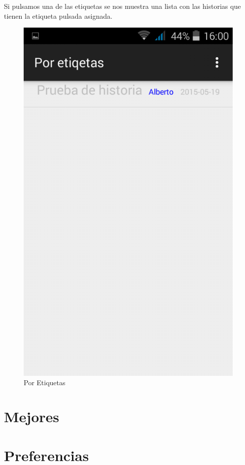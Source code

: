 \documentclass[11pt,a4paper, titlepage]{article}
\begin{document}
	Si pulsamos una de las etiquetas se nos muestra una lista con las historias que tienen la etiqueta pulsada asignada.
	
	\begin{figure}[hbtp]
		\centering
		\includegraphics[scale = 0.25 ]{img/7}
		\caption{Por Etiquetas}
		\label{p15}
	\end{figure}
	
	\FloatBarrier
	\section[Mejores]{Mejores}
	
	\FloatBarrier
	\section[Preferencias]{Preferencias}
	
\end{document}
